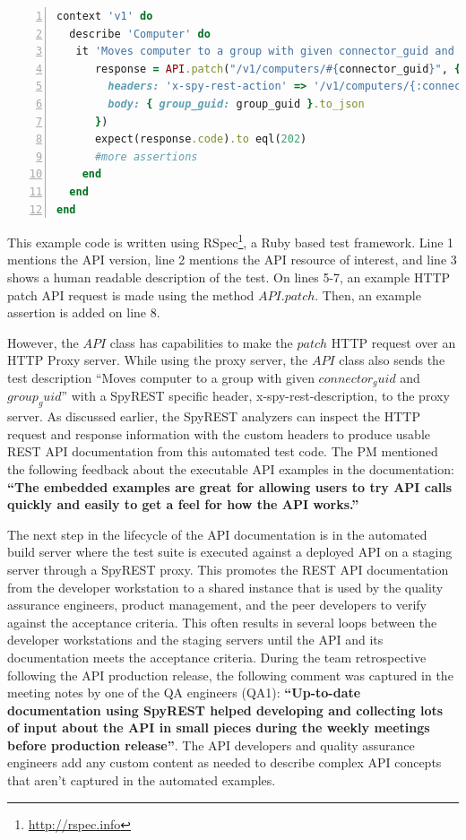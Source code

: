 \documentclass[10pt, conference]{IEEEtran}
\begin{document}
\begin{lstlisting}[language=Ruby,breaklines=true,showspaces=false,showstringspaces=false,numbers=left,xleftmargin=2em,caption={Functional Test Code},label=listing_test]
context 'v1' do
  describe 'Computer' do
   it 'Moves computer to a group with given connector_guid and group_guid' do
      response = API.patch("/v1/computers/#{connector_guid}", {
        headers: 'x-spy-rest-action' => '/v1/computers/{:connector_guid}',
        body: { group_guid: group_guid }.to_json
      })
      expect(response.code).to eql(202)
      #more assertions
    end
  end
end
\end{lstlisting}

This example code is written using RSpec\footnote{\url{http://rspec.info}}, a Ruby based test framework. Line 1 mentions the API version, line 2 mentions the API resource of interest, and line 3 shows a human readable description of the test. On lines 5-7, an example HTTP patch API request is made using the method $API.patch$. Then, an example assertion is added on line 8.

However, the $API$ class has capabilities to make the $patch$ HTTP request over an HTTP Proxy server. While using the proxy server, the $API$ class also sends the test description ``Moves computer to a group with given $connector_guid$ and $group_guid$'' with a SpyREST specific header, x-spy-rest-description, to the proxy server. As discussed earlier, the SpyREST analyzers can inspect the HTTP request and response information with the custom headers to produce usable REST API documentation from this automated test code. The PM mentioned the following feedback about the executable API examples in the documentation: \textbf{``The embedded examples are great for allowing users to try API calls quickly and easily to get a feel for how the API works.''}

The next step in the lifecycle of the API documentation is in the automated build server where the test suite is executed against a deployed API on a staging server through a SpyREST proxy. This promotes the REST API documentation from the developer workstation to a shared instance that is used by the quality assurance engineers, product management, and the peer developers to verify against the acceptance criteria. This often results in several loops between the developer workstations and the staging servers until the API and its documentation meets the acceptance criteria. During the team retrospective following the API production release, the following comment was captured in the meeting notes by one of the QA engineers (QA1):  \textbf{``Up-to-date documentation using SpyREST helped developing and collecting lots of input about the API in small pieces during the weekly meetings before production release''}. The API developers and quality assurance engineers add any custom content as needed to describe complex API concepts that aren't captured in the automated examples.
\end{document}
